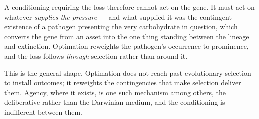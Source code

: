 \begin{example}
A conditioning requiring the loss therefore cannot act on the gene. It
must act on whatever \emph{supplies the pressure} --- and what supplied
it was the contingent existence of a pathogen presenting the very
carbohydrate in question, which converts the gene from an asset into the
one thing standing between the lineage and extinction. Optimation
reweights the pathogen's occurrence to prominence, and the loss follows
\emph{through} selection rather than around it.

This is the general shape. Optimation does not reach past evolutionary
selection to install outcomes; it reweights the contingencies that make
selection deliver them. Agency, where it exists, is one such mechanism
among others, the deliberative rather than the Darwinian medium, and the conditioning is indifferent between them.
\end{example}

